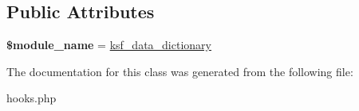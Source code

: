 \subsection*{Public Attributes}
\begin{DoxyCompactItemize}
\item 
\hypertarget{classhooks__ksf__data__dictionary_ab992bd3fc9279df2411ed79dca0e6f6d}{}\label{classhooks__ksf__data__dictionary_ab992bd3fc9279df2411ed79dca0e6f6d} 
{\bfseries \$module\+\_\+name} = \textquotesingle{}\hyperlink{classksf__data__dictionary}{ksf\+\_\+data\+\_\+dictionary}\textquotesingle{}
\end{DoxyCompactItemize}


The documentation for this class was generated from the following file\+:\begin{DoxyCompactItemize}
\item 
hooks.\+php\end{DoxyCompactItemize}
